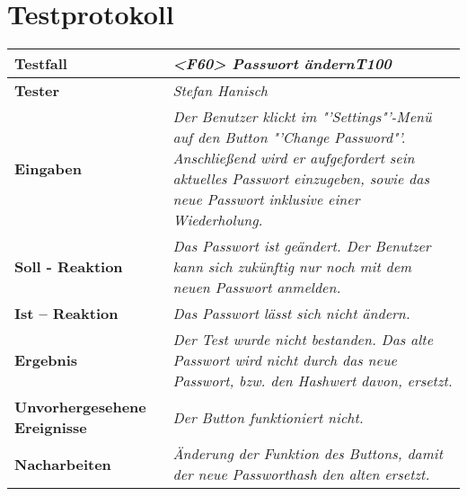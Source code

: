 \section{Testprotokoll}

\begin{longtable}{|p{4cm}|p{11cm}|}
\hline
\textbf{Testfall} & \textit{<F60> Passwort ändern\textbf{T100}} \\
\hline
\textbf{Tester} & \textit{Stefan Hanisch} \\
\hline
\textbf{Eingaben} & \textit{Der Benutzer klickt im "'Settings"'-Menü auf den Button "'Change Password"'. Anschließend wird er aufgefordert sein aktuelles Passwort einzugeben, sowie das neue Passwort inklusive einer Wiederholung.} \\
\hline
\textbf{Soll - Reaktion} & \textit{Das Passwort ist geändert. Der Benutzer kann sich zukünftig nur noch mit dem neuen Passwort anmelden.} \\
\hline
\textbf{Ist -- Reaktion} & \textit{Das Passwort lässt sich nicht ändern.} \\
\hline
\textbf{Ergebnis} & \textit{Der Test wurde nicht bestanden. Das alte Passwort wird nicht durch das neue Passwort, bzw. den Hashwert davon, ersetzt.} \\
\hline
\textbf{Unvorhergesehene Ereignisse} &
\textit{Der Button funktioniert nicht.} \\
\hline
\textbf{Nacharbeiten } & \textit{Änderung der Funktion des Buttons, damit der neue Passworthash den alten ersetzt.} \\
\hline
\end{longtable}
